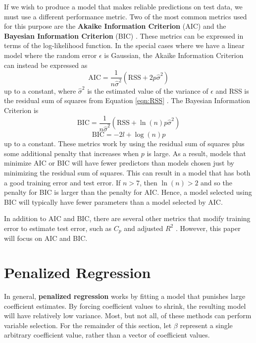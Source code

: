\documentclass{article}
\newcommand{\RSS}{\text{RSS}}
\begin{document}
If we wish to produce a model that makes reliable predictions on test data, we must use a different performance metric. Two of the most common metrics used for this purpose are the \textbf{Akaike Information Criterion} (AIC) and the \textbf{Bayesian Information Criterion} (BIC) \cite{akaike1998information, schwarz1978estimating}. These metrics can be expressed in terms of the log-likelihood function. In the special cases where we have a linear model where the random error $\epsilon$ is Gaussian, the Akaike Information Criterion can instead be expressed as
\begin{equation}
	\text{AIC} = \frac{1}{n\hat{\sigma}^2}(\RSS + 2p\hat{\sigma}^2)
\end{equation}
up to a constant, where $\hat{\sigma}^2$ is the estimated value of the variance of $\epsilon$ and RSS is the residual sum of squares from Equation \ref{eqn:RSS} \cite{james2013introduction}. The Bayesian Information Criterion is
\begin{equation}
	\text{BIC} = \frac{1}{n\hat{\sigma}^2}(\RSS + \ln(n)p\hat{\sigma}^2)
\end{equation}
\begin{equation}
	\text{BIC} = -2l + \log(n)p
\end{equation}
up to a constant. These metrics work by using the residual sum of squares plus some additional penalty that increases when $p$ is large. As a result, models that minimize AIC or BIC will have fewer predictors than models chosen just by minimizing the residual sum of squares. This can result in a model that has both a good training error and test error. If $n>7$, then $\ln(n)>2$ and so the penalty for BIC is larger than the penalty for AIC. Hence, a model selected using BIC will typically have fewer parameters than a model selected by AIC.

In addition to AIC and BIC, there are several other metrics that modify training error to estimate test error, such as $C_p$ and adjusted $R^2$ \cite{james2013introduction}. However, this paper will focus on AIC and BIC.
\section{Penalized Regression}

In general, \textbf{penalized regression} works by fitting a model that punishes large coefficient estimates. By forcing coefficient values to shrink, the resulting model will have relatively low variance. Most, but not all, of these methods can perform variable selection. For the remainder of this section, let $\beta$ represent a single arbitrary coefficient value, rather than a vector of coefficient values.
\end{document}
